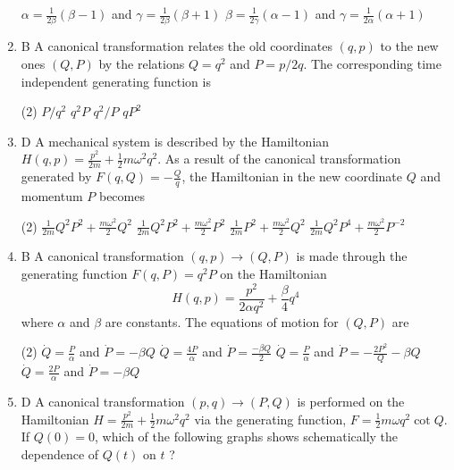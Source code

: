 \begin{enumerate}
\begin{tasks}
		\task[\textbf{c.}]$\alpha=\frac{1}{2 \beta}(\beta-1)$ and $\gamma=\frac{1}{2 \beta}(\beta+1)$
		\task[\textbf{d.}] $\beta=\frac{1}{2 \gamma}(\alpha-1)$ and $\gamma=\frac{1}{2 \alpha}(\alpha+1)$
	\end{tasks}
	\item B A canonical transformation relates the old coordinates $(q, p)$ to the new ones $(Q, P)$ by the relations $Q=q^{2}$ and $P=p / 2 q$. The corresponding time independent generating function is
	{}
	 \begin{tasks}(2)
		\task[\textbf{a.}]$P / q^{2}$
		\task[\textbf{b.}]$q^{2} P$
		\task[\textbf{c.}]$q^{2} / P$
		\task[\textbf{d.}] $q P^{2}$ 
	\end{tasks}
	\item D A mechanical system is described by the Hamiltonian $H(q, p)=\frac{p^{2}}{2 m}+\frac{1}{2} m \omega^{2} q^{2}$. As a result of the canonical transformation generated by $F(q, Q)=-\frac{Q}{q}$, the Hamiltonian in the new coordinate $Q$ and momentum $P$ becomes
{}
	 \begin{tasks}(2)
		\task[\textbf{a.}] $\frac{1}{2 m} Q^{2} P^{2}+\frac{m \omega^{2}}{2} Q^{2}$
		\task[\textbf{b.}]$\frac{1}{2 m} Q^{2} P^{2}+\frac{m \omega^{2}}{2} P^{2}$
		\task[\textbf{c.}]$\frac{1}{2 m} P^{2}+\frac{m \omega^{2}}{2} Q^{2}$
		\task[\textbf{d.}] $\frac{1}{2 m} Q^{2} P^{4}+\frac{m \omega^{2}}{2} P^{-2}$
	\end{tasks}
	\item B A canonical transformation $(q, p) \rightarrow(Q, P)$ is made through the generating function $F(q, P)=q^{2} P$ on the Hamiltonian
	$$
	H(q, p)=\frac{p^{2}}{2 \alpha q^{2}}+\frac{\beta}{4} q^{4}
	$$
	where $\alpha$ and $\beta$ are constants. The equations of motion for $(Q, P)$ are
{}
	 \begin{tasks}(2)
		\task[\textbf{a.}] $\dot{Q}=\frac{P}{\alpha}$ and $\dot{P}=-\beta Q$
		\task[\textbf{b.}] $\dot{Q}=\frac{4 P}{\alpha}$ and $\dot{P}=\frac{-\beta Q}{2}$
		\task[\textbf{c.}]$\dot{Q}=\frac{P}{\alpha}$ and $\dot{P}=-\frac{2 P^{2}}{Q}-\beta Q$
		\task[\textbf{d.}] $\dot{Q}=\frac{2 P}{\alpha}$ and $\dot{P}=-\beta Q$
	\end{tasks}
	\item D A canonical transformation $(p, q) \rightarrow(P, Q)$ is performed on the Hamiltonian $H=\frac{p^{2}}{2 m}+\frac{1}{2} m \omega^{2} q^{2}$ via the generating function, $F=\frac{1}{2} m \omega q^{2} \cot Q$. If $Q(0)=0$, which of the following graphs shows schematically the dependence of $Q(t)$ on $t$ ?

\end{enumerate}
